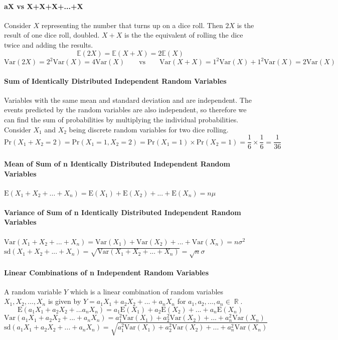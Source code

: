 \documentclass[a4paper,twoside,10pt]{article}
\DeclareMathOperator\R{\mathbb{R}}
\newcommand{\E}{\mathbb{E}}
\begin{document}
			\paragraph{aX vs X+X+X+...+X} Consider $X$ representing the number that turns up on a dice roll. Then $2X$ is the result of one dice roll, doubled. $X+X$ is the the equivalent of rolling the dice twice and adding the results.
			\[
				\E(2X)=\E(X+X)=2\E(X)
			\]
			\[
				\mathrm{Var}(2X)=2^2\mathrm{Var}(X)=4\mathrm{Var}(X) \qquad \text{vs} \qquad \mathrm{Var}(X+X)=1^2\mathrm{Var}(X)+1^2\mathrm{Var}(X)=2\mathrm{Var}(X)
			\]
			
			\paragraph{Sum of Identically Distributed Independent Random Variables} Variables with the same mean and standard deviation and are independent. The events predicted by the random variables are also independent, so therefore we can find the sum of probabilities by multiplying the individual probabilities. Consider $X_1$ and $X_2$ being discrete random variables for two dice rolling.
			\[
				\mathrm{Pr}(X_1+X_2=2)=\mathrm{Pr}(X_1=1,X_2=2)=\mathrm{Pr}(X_1=1)\times\mathrm{Pr}(X_2=1)=\frac{1}{6}\times\frac{1}{6}=\frac{1}{36}
			\]
			
			\paragraph{Mean of Sum of n Identically Distributed Independent Random Variables} $\displaystyle\mathrm{E}(X_1+X_2+...+X_n)=\mathrm{E}(X_1)+\mathrm{E}(X_2)+...+\mathrm{E}(X_n)=n\mu$
			
			\paragraph{Variance of Sum of n Identically Distributed Independent Random Variables} $\displaystyle\mathrm{Var}(X_1+X_2+...+X_n)=\mathrm{Var}(X_1)+\mathrm{Var}(X_2)+...+\mathrm{Var}(X_n)=n\sigma^2$\\
			$\displaystyle\mathrm{sd}(X_1+X_2+...+X_n)=\sqrt{\mathrm{Var}(X_1+X_2+...+X_n)}=\sqrt{n}\sigma$
			
			\paragraph{Linear Combinations of n Independent Random Variables} A random variable $Y$ which is a linear combination of random variables $X_1,X_2,...,X_n$ is given by $Y=a_1X_1+a_2X_2+...+a_nX_n$ for $a_1,a_2,...,a_n\in\R$.
			\[
				\mathrm{E}(a_1X_1+a_2X_2+...a_nX_n)=a_1\mathrm{E}(X_1)+a_2\mathrm{E}(X_2)+...+a_n\mathrm{E}(X_n)
			\]
			\[
				\mathrm{Var}(a_1X_1+a_2X_2+...+a_nX_n)=a_1^2\mathrm{Var}(X_1)+a_2^2\mathrm{Var}(X_2)+...+a_n^2\mathrm{Var}(X_n)
			\]
			\[
				\mathrm{sd}(a_1X_1+a_2X_2+...+a_nX_n)=\sqrt{a_1^2\mathrm{Var}(X_1)+a_2^2\mathrm{Var}(X_2)+...+a_n^2\mathrm{Var}(X_n)}
			\]
		
\end{document}
